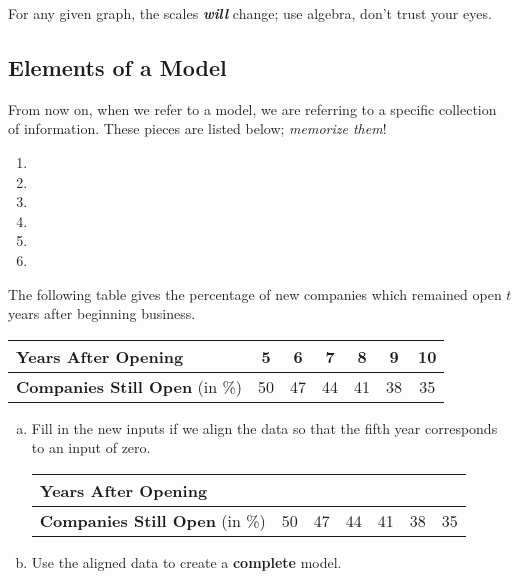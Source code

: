 \documentclass[notes]{subfiles}
\begin{document}
		For any given graph, the scales \emph{\textbf{will}} change; use algebra, don't trust your eyes.
		\newpage
		
	\subsection*{Elements of a Model}
		From now on, when we refer to a model, we are referring to a specific collection of information.  These pieces are listed below; \emph{memorize them}!  \\
		\begin{enumerate}[(1)]
			\item {}
			\item {}
			\item {}
			\item {}
			\item {}
			\item {}
		\end{enumerate}
		\begin{ex}
			The following table gives the percentage of new companies which remained open $t$ years after beginning business.
			\begin{center} 
				{\renewcommand{\arraystretch}{1.2}
				\begin{tabular}{|l||c|c|c|c|c|c|} \hline
					\textbf{Years After Opening} & 5 & 6 & 7 & 8 & 9 & 10\\ \hline
					\textbf{Companies Still Open} (in \%) & 50 & 47 & 44 & 41 & 38 & 35\\ \hline
				\end{tabular}
				}
			\end{center}
			\begin{enumerate}[(a)]
				\item Fill in the new inputs if we align the data so that the fifth year corresponds to an input of zero.
					\begin{center} 
						{\renewcommand{\arraystretch}{1.75}
						\begin{tabular}{|l||P{.5in}|P{.5in}|P{.5in}|P{.5in}|P{.5in}|P{.5in}|} \hline
							\textbf{Years After Opening} &  &  &  &  &  & \\ \hline
							\textbf{Companies Still Open} (in \%) & 50 & 47 & 44 & 41 & 38 & 35\\ \hline
						\end{tabular}
						}
					\end{center}
				\item Use the aligned data to create a \textbf{complete} model.
			\end{enumerate}
				\newpage
		\end{ex}
\end{document}

